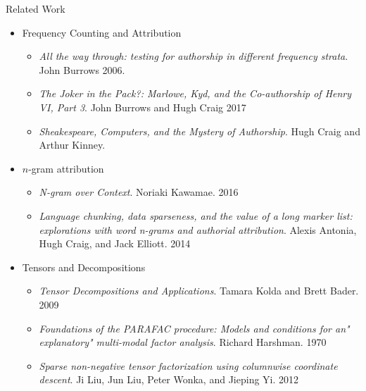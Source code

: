 \documentclass[handout]{beamer}
\begin{document}
\begin{frame}[allowframebreaks]{Related Work}
  \begin{itemize}[<+->]
  \item Frequency Counting and Attribution
    \begin{itemize}
    \item {\em All the way through: testing for authorship in different
      frequency strata}. John Burrows 2006.~\cite{burrows2006}
    \item {\em The Joker in the Pack?: Marlowe, Kyd, and the
        Co-authorship of Henry VI, Part 3}. John Burrows and Hugh
      Craig 2017\cite{burrows2017}
    \item {\em Sheakespeare, Computers, and the Mystery of
        Authorship}. Hugh Craig and Arthur Kinney.~\cite{craig2009}
    \end{itemize}
  \item $n$-gram attribution
    \begin{itemize}[<+->]
    \item {\em N-gram over Context}. Noriaki Kawamae. 2016~\cite{kawamae2016}
    \item {\em Language chunking, data sparseness, and the value of a
        long marker list: explorations with word n-grams and authorial
        attribution}. Alexis Antonia, Hugh Craig, and Jack
      Elliott. 2014~\cite{antonia2014}
    \end{itemize}
  \item Tensors and Decompositions
    \begin{itemize}[<+->]
    \item {\em Tensor Decompositions and Applications}. Tamara Kolda
      and Brett Bader. 2009~\cite{kolda2009}
    \item {\em Foundations of the PARAFAC procedure: Models and
        conditions for an" explanatory" multi-modal factor
        analysis}. Richard Harshman. 1970~\cite{harshman1970}
    \item {\em Sparse non-negative tensor factorization using
        columnwise coordinate descent}. Ji Liu, Jun Liu, Peter Wonka,
      and Jieping Yi. 2012\cite{liu2012sparse}
    \end{itemize}
  \end{itemize}
\end{frame}
\end{document}
